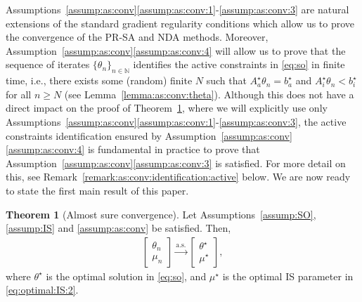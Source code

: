 \documentclass[11pt,a4paper]{article}
\theoremstyle{definition}
\newtheorem{theorem}{Theorem}[section]
\begin{document}
Assumptions~\ref{assump:as:conv}\ref{assump:as:conv:1}-\ref{assump:as:conv:3} are natural extensions of the standard gradient regularity conditions which allow us to prove the convergence of the PR-SA and NDA methods. 
Moreover, Assumption~\ref{assump:as:conv}\ref{assump:as:conv:4} will allow us to prove that the sequence of iterates $\{\theta_n\}_{n \in \mathbb N}$ identifies the active constraints in \eqref{eq:so} in finite time, i.e., there exists some (random) finite $N$ such that $A_{a}^\star \theta_n = b_a^\star$ and $A_{i}^\star \theta_n < b_i^\star$ for all $n \geq N$ (see Lemma~\ref{lemma:as:conv:theta}). Although this does not have a direct impact on the proof of Theorem~\ref{thm:as:conv}, where we will explicitly use only Assumptions~\ref{assump:as:conv}\ref{assump:as:conv:1}-\ref{assump:as:conv:3}, the active constraints identification ensured by Assumption~\ref{assump:as:conv}\ref{assump:as:conv:4} is fundamental in practice to prove that Assumption~\ref{assump:as:conv}\ref{assump:as:conv:3} is satisfied. For more detail on this, see Remark~\ref{remark:as:conv:identification:active} below.
We are now ready to state the first main result of this paper.

\begin{theorem}[Almost sure convergence]
\label{thm:as:conv}
Let Assumptions~\ref{assump:SO}, \ref{assump:IS} and \ref{assump:as:conv} be satisfied. Then,
\begin{align}
\label{eq:as:conv:theta:mu}
    \begin{bmatrix}\theta_n \\ \mu_n \end{bmatrix} \overset{\text{a.s.}}{\to} \begin{bmatrix}\theta^\star \\ \mu^\star \end{bmatrix},
\end{align}
where $\theta^\star$ is the optimal solution in \eqref{eq:so}, and $\mu^\star$ is the optimal IS parameter in \eqref{eq:optimal:IS:2}.
\end{theorem}
\end{document}
